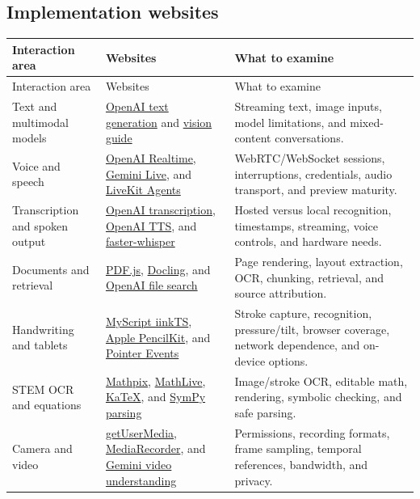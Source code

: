 \documentclass[11pt]{article}
\begin{document}
\subsection{Implementation websites}
\begin{longtable}{@{}P{0.22\textwidth}P{0.31\textwidth}P{0.39\textwidth}@{}}
\toprule
Interaction area & Websites & What to examine \\
\midrule
\endfirsthead
\toprule Interaction area & Websites & What to examine \\
\midrule
\endhead
Text and multimodal models & \href{https://developers.openai.com/api/docs/guides/text}{OpenAI text generation} and \href{https://developers.openai.com/api/docs/guides/images-vision}{vision guide} & Streaming text, image inputs, model limitations, and mixed-content conversations. \\
Voice and speech & \href{https://developers.openai.com/api/docs/guides/realtime}{OpenAI Realtime}, \href{https://ai.google.dev/gemini-api/docs/live-api}{Gemini Live}, and \href{https://docs.livekit.io/agents/}{LiveKit Agents} & WebRTC/WebSocket sessions, interruptions, credentials, audio transport, and preview maturity. \\
Transcription and spoken output & \href{https://developers.openai.com/api/docs/guides/speech-to-text}{OpenAI transcription}, \href{https://developers.openai.com/api/docs/guides/text-to-speech}{OpenAI TTS}, and \href{https://github.com/SYSTRAN/faster-whisper}{faster-whisper} & Hosted versus local recognition, timestamps, streaming, voice controls, and hardware needs. \\
Documents and retrieval & \href{https://mozilla.github.io/pdf.js/}{PDF.js}, \href{https://github.com/docling-project/docling}{Docling}, and \href{https://developers.openai.com/api/docs/guides/tools-file-search}{OpenAI file search} & Page rendering, layout extraction, OCR, chunking, retrieval, and source attribution. \\
Handwriting and tablets & \href{https://developer.myscript.com/doc/interactive-ink/4.1/web/iinkts/get-started/}{MyScript iinkTS}, \href{https://developer.apple.com/documentation/pencilkit}{Apple PencilKit}, and \href{https://developer.mozilla.org/en-US/docs/Web/API/Pointer_events}{Pointer Events} & Stroke capture, recognition, pressure/tilt, browser coverage, network dependence, and on-device options. \\
STEM OCR and equations & \href{https://docs.mathpix.com/}{Mathpix}, \href{https://mathlive.io/mathfield/}{MathLive}, \href{https://katex.org/docs/api}{KaTeX}, and \href{https://docs.sympy.org/latest/modules/parsing.html}{SymPy parsing} & Image/stroke OCR, editable math, rendering, symbolic checking, and safe parsing. \\
Camera and video & \href{https://developer.mozilla.org/en-US/docs/Web/API/MediaDevices/getUserMedia}{getUserMedia}, \href{https://developer.mozilla.org/en-US/docs/Web/API/MediaRecorder}{MediaRecorder}, and \href{https://ai.google.dev/gemini-api/docs/video-understanding}{Gemini video understanding} & Permissions, recording formats, frame sampling, temporal references, bandwidth, and privacy. \\
\bottomrule
\end{longtable}
\end{document}
